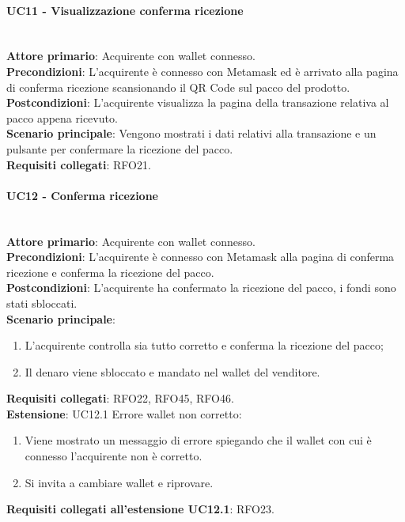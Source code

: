 \documentclass[a4paper, 12pt]{article}
\begin{document}
\paragraph{UC11 - Visualizzazione conferma ricezione}\\
\textbf{Attore primario}: Acquirente con wallet connesso.\\
\textbf{Precondizioni}: L'acquirente è connesso con Metamask ed è arrivato alla pagina di conferma ricezione scansionando il QR Code sul pacco del prodotto.\\
\textbf{Postcondizioni}: L'acquirente visualizza la pagina della transazione relativa al pacco appena ricevuto.\\
\textbf{Scenario principale}:
Vengono mostrati i dati relativi alla transazione e un pulsante per confermare la ricezione del pacco.\\
\textbf{Requisiti collegati}: RFO21.

\paragraph{UC12 - Conferma ricezione}\\
\textbf{Attore primario}: Acquirente con wallet connesso.\\
\textbf{Precondizioni}: L'acquirente è connesso con Metamask alla pagina di conferma ricezione e conferma la ricezione del pacco.\\
\textbf{Postcondizioni}: L'acquirente ha confermato la ricezione del pacco, i fondi sono stati sbloccati.\\
\textbf{Scenario principale}:
\begin{enumerate}
    \item L'acquirente controlla sia tutto corretto e conferma la ricezione del pacco;
    \item Il denaro viene sbloccato e mandato nel wallet del venditore.
\end{enumerate}
\textbf{Requisiti collegati}: RFO22, RFO45, RFO46.\\
\textbf{Estensione}:
UC12.1 Errore wallet non corretto:
\begin{enumerate}
    \item Viene mostrato un messaggio di errore spiegando che il wallet con cui è connesso l'acquirente non è corretto.
    \item Si invita a cambiare wallet e riprovare.
\end{enumerate}
\textbf{Requisiti collegati all'estensione UC12.1}: RFO23.
\end{document}
